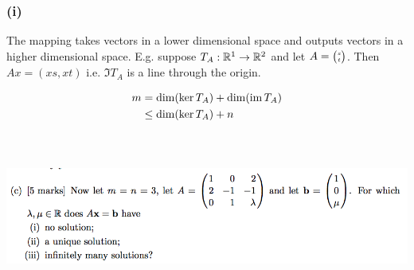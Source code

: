 \documentclass[12pt]{article}
\begin{document}
\subsubsection*{(i)} The mapping takes vectors in a lower dimensional space and
outputs vectors in a higher dimensional space. E.g. suppose $T_A:\mathbb{R}^1 \to \mathbb{R}^2$
and let $A = \tiny{\begin{pmatrix}s\\t\end{pmatrix}}$. Then $Ax = (xs, xt)$ i.e. $\Im T_A$ is a line
through the origin.

\begin{align*}
  m &=    \dim(\ker T_A) + \dim(\operatorname{\text{im}} T_A)\\
    &\leq \dim(\ker T_A) + n\\
\end{align*}
~\\
\subsection*{} %
\begin{mdframed}
\includegraphics[width=400pt]{img/oxford-prelims-2017-A-2-3.png}
\end{mdframed}
\end{document}
